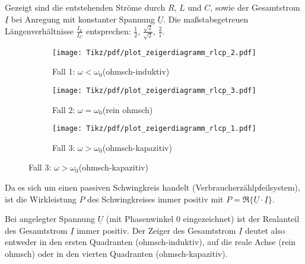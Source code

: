 \begin{frame}[t]
{    Gezeigt sind die entstehenden Ströme durch $R$, $L$ und $C$, sowie der Gesamtstrom $\underline{I}$ bei Anregung mit konstanter Spannung $\underline{U}$.
    Die maßstabsgetreuen Längenverhältnisse $\frac{I_L}{I_C}$ entsprechen: $\frac{1}{2}$, $\frac{\sqrt{2}}{\sqrt{2}}$, $\frac{2}{1}$.

    \begin{figure}[H]\centering
        \captionsetup[subfigure]{justification=centering,}
        \begin{subfigure}{0.3\textwidth}\centering
            \texttt{[image: Tikz/pdf/plot\_zeigerdiagramm\_rlcp\_2.pdf]}
            \caption{Fall 1: $\omega < \omega_0$\newline(ohmsch-induktiv)}
        \end{subfigure}\hfill%
        \begin{subfigure}{0.3\textwidth}\centering
            \texttt{[image: Tikz/pdf/plot\_zeigerdiagramm\_rlcp\_3.pdf]}
            \caption{Fall 2: $\omega = \omega_0$\newline(rein ohmsch)}
        \end{subfigure}\hfill%
        \begin{subfigure}{0.3\textwidth}\centering
            \texttt{[image: Tikz/pdf/plot\_zeigerdiagramm\_rlcp\_1.pdf]}
            \caption{Fall 3: $\omega > \omega_0$\newline(ohmsch-kapazitiv)}
        \end{subfigure}
        \label{fig:plot:rlcp:zeigerdiagramm}
    \end{figure}

    Da es sich um einen passiven Schwingkreis handelt (Verbraucherzählpfeilsystem), 
    ist die Wirkleistung $P$ des Schwingkreises immer positiv mit $P=\Re\{\underline{U}\cdot\underline{I}\}$.
    
    Bei angelegter Spannung $\underline{U}$ (mit Phasenwinkel $0$ eingezeichnet) 
    ist der Realanteil des Gesamtstrom $\underline{I}$ immer positiv.
    Der Zeiger des Gesamtstrom $\underline{I}$ deutet also entweder in den ersten Quadranten (ohmsch-induktiv), 
    auf die reale Achse (rein ohmsch) oder in den vierten Quadranten (ohmsch-kapazitiv).
    }
\end{frame}


